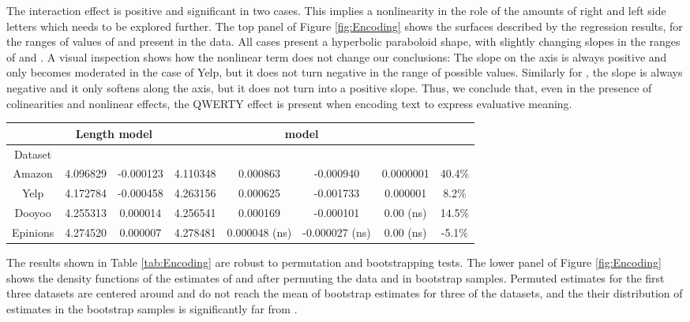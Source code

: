 \documentclass[letterpaper]{sig-alternate-2013}
\begin{document}
The interaction effect  is positive and significant in two cases. This
implies a nonlinearity in the role of the amounts of right and left side
letters which needs to be explored further. The top panel of Figure
\ref{fig:Encoding} shows the surfaces described by the regression results, for
the ranges of values of  and  present in the data. All cases present a
hyperbolic paraboloid shape, with slightly changing slopes in the ranges of
 and . A visual inspection shows how the nonlinear term  does
not change our conclusions: The slope on the  axis is always positive and
only becomes moderated in the case of Yelp, but it does not turn negative in
the range of possible values. Similarly for , the slope is always negative
and it only softens along the  axis,  but it does not turn into a positive
slope. Thus, we conclude that, even in the presence of colinearities and
nonlinear effects, the QWERTY effect is present when encoding text to express
evaluative meaning.


\begin{table*}[bp]
\begin{center}
    \begin{tabular}{c|c|c|c|c|c|c|c}
    	&     	\multicolumn{2}{|c|}{Length model}    &  \multicolumn{4}{|c|}{ model}   & \\ \hline
Dataset	&  &  &  &  &  &  &  \\ \hline
Amazon &  4.096829  & -0.000123  & 4.110348 & 0.000863 & -0.000940 &0.0000001& 40.4\%  \\
Yelp &  4.172784  & -0.000458  & 4.263156 & 0.000625 & -0.001733 &0.000001& 8.2\%  \\
Dooyoo &  4.255313  & 0.000014  & 4.256541 & 0.000169 & -0.000101 &0.00 (ns)& 14.5\%  \\
Epinions &  4.274520  & 0.000007  &  4.278481 & 0.000048 (ns) & -0.000027 (ns) &0.00 (ns)& -5.1\%  \\
\end{tabular}
\end{center}
  \caption{Summary of results of the encoding study. All estimates are significant  except those marked as (ns). Results show that, for three cases, the amounts of right side letters (R) and left side letters (L) explain additional (adjusted) variance than in the length model, and have significant estimates in the directions predicted by the QWERTY effect.\label{tab:Encoding}}
\end{table*}

The results shown in Table \ref{tab:Encoding} are robust to permutation and
bootstrapping tests. The lower panel of Figure \ref{fig:Encoding} shows the
density functions of the estimates of  and  after permuting the data
and in bootstrap samples. Permuted estimates for the first three datasets are
centered around  and do not reach the mean of bootstrap estimates for three
of the datasets, and the their distribution of estimates in the bootstrap
samples is significantly far from .
\end{document}
